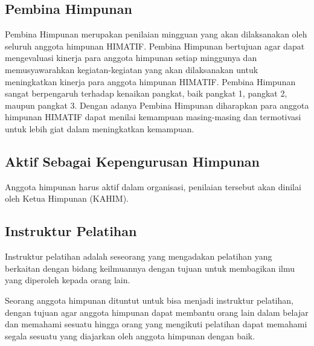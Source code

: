 \subsection{Pembina Himpunan}
\par
Pembina Himpunan merupakan penilaian mingguan yang akan dilaksanakan oleh seluruh anggota himpunan HIMATIF. Pembina Himpunan bertujuan agar dapat mengevaluasi kinerja para anggota himpunan setiap minggunya dan memusyawarahkan kegiatan-kegiatan yang akan dilaksanakan untuk meningkatkan kinerja para anggota himpunan HIMATIF. Pembina Himpunan sangat berpengaruh terhadap kenaikan pangkat, baik pangkat 1, pangkat 2, maupun pangkat 3. Dengan adanya Pembina Himpunan diharapkan para anggota himpunan HIMATIF dapat menilai kemampuan masing-masing dan termotivasi untuk lebih giat dalam meningkatkan kemampuan.

\subsection{Aktif Sebagai Kepengurusan Himpunan}
\par
Anggota himpunan harus aktif dalam organisasi, penilaian tersebut akan dinilai oleh Ketua Himpunan (KAHIM).

\subsection{Instruktur Pelatihan}
\par
Instruktur pelatihan adalah seseorang yang mengadakan pelatihan yang berkaitan dengan bidang keilmuannya dengan tujuan untuk membagikan ilmu yang diperoleh kepada orang lain.\\
\par 
Seorang anggota himpunan dituntut untuk bisa menjadi instruktur pelatihan, dengan tujuan agar anggota himpunan dapat membantu orang lain dalam belajar dan memahami sesuatu hingga orang yang mengikuti pelatihan dapat memahami segala sesuatu yang diajarkan oleh anggota himpunan dengan baik.

